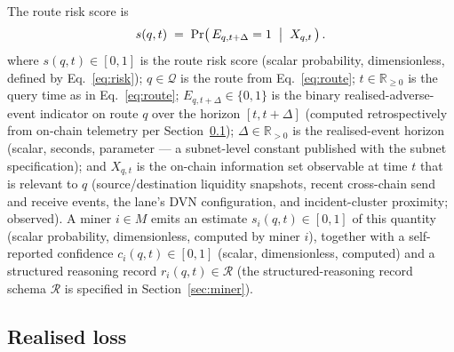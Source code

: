 \documentclass[11pt,a4paper]{article}
\begin{document}
The route risk score is
\begin{equation}
  s(q, t) \;=\; \Pr\bigl(\, E_{q, t+\Delta} = 1 \;\bigm|\; X_{q, t} \,\bigr) \,.
  \label{eq:risk}
\end{equation}
where $s(q, t) \in [0, 1]$ is the route risk score (scalar probability,
dimensionless, defined by Eq.~\eqref{eq:risk}); $q \in \mathcal{Q}$ is the route
from Eq.~\eqref{eq:route}; $t \in \mathbb{R}_{\ge 0}$ is the query time as in
Eq.~\eqref{eq:route}; $E_{q, t+\Delta} \in \{0, 1\}$ is the binary realised-adverse-event
indicator on route $q$ over the horizon $[t, t + \Delta]$ (computed retrospectively
from on-chain telemetry per Section~\ref{sec:formal:realised}); $\Delta \in
\mathbb{R}_{>0}$ is the realised-event horizon (scalar, seconds, parameter --- a
subnet-level constant published with the subnet specification); and $X_{q, t}$ is
the on-chain information set observable at time $t$ that is relevant to $q$
(source/destination liquidity snapshots, recent cross-chain send and receive
events, the lane's DVN configuration, and incident-cluster proximity; observed).
A miner $i \in M$ emits an estimate $s_i(q, t) \in [0, 1]$ of this quantity
(scalar probability, dimensionless, computed by miner $i$), together with a
self-reported confidence $c_i(q, t) \in [0, 1]$ (scalar, dimensionless, computed)
and a structured reasoning record $r_i(q, t) \in \mathcal{R}$ (the
structured-reasoning record schema $\mathcal{R}$ is specified in
Section~\ref{sec:miner}).

\subsection{Realised loss}\label{sec:formal:realised}
\end{document}
